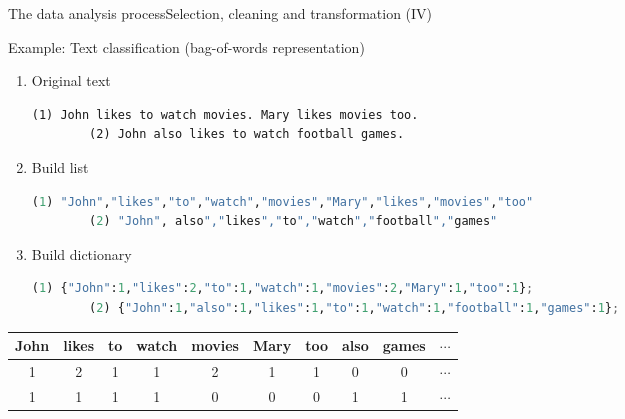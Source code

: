 \documentclass[10pt,compress]{beamer} %
\begin{document}
\begin{frame}[fragile]{The data analysis process}{Selection, cleaning and transformation (IV)}
	\begin{exampleblock}{Example: Text classification (bag-of-words representation)}
	 \vspace{-0.2cm}
	\begin{enumerate}
		\item Original text\\
		\begin{lstlisting}[basicstyle=\scriptsize]
		(1) John likes to watch movies. Mary likes movies too.
		(2) John also likes to watch football games.
		\end{lstlisting}
		\item Build list\\
		\begin{lstlisting}[language=Python,basicstyle=\tiny]
		(1) "John","likes","to","watch","movies","Mary","likes","movies","too"
		(2) "John", also","likes","to","watch","football","games"
		\end{lstlisting}
		\item Build dictionary\\
		\begin{lstlisting}[language=Python,basicstyle=\tiny]
		(1) {"John":1,"likes":2,"to":1,"watch":1,"movies":2,"Mary":1,"too":1};
		(2) {"John":1,"also":1,"likes":1,"to":1,"watch":1,"football":1,"games":1};
		\end{lstlisting}
	\end{enumerate}

	 \vspace{-0.4cm}

	\begin{center}
	\begin{tabular}{cccccccccc}\hline
		 John & likes & to & watch & movies & Mary & too & also & games & $\cdots$ \\\hline
		 1    & 2     & 1  & 1     & 2      & 1    & 1   & 0 	& 0 	& $\cdots$ \\
		 1    & 1     & 1  & 1     & 0      & 0    & 0   & 1 	& 1 	& $\cdots$ \\
		 \hline
	 \end{tabular}
	 \end{center}
	 \vspace{-0.4cm}
	 \end{exampleblock}
\end{frame}
\end{document}
